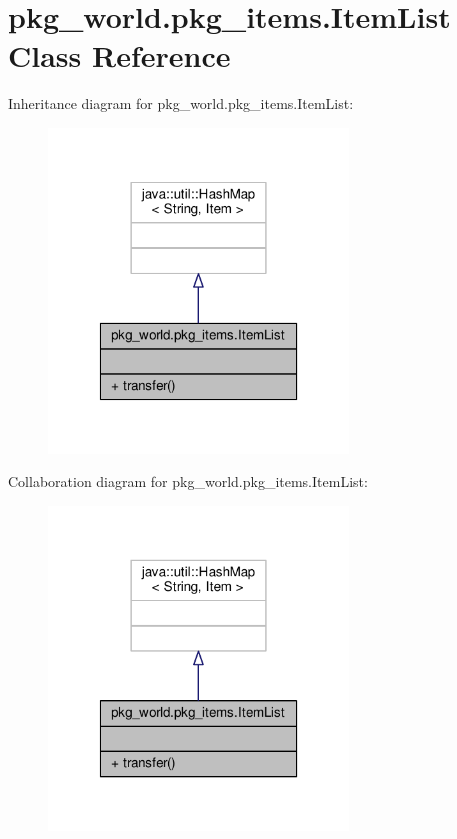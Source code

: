 \hypertarget{classpkg__world_1_1pkg__items_1_1ItemList}{\section{pkg\-\_\-world.\-pkg\-\_\-items.\-Item\-List Class Reference}
\label{classpkg__world_1_1pkg__items_1_1ItemList}
}


Inheritance diagram for pkg\-\_\-world.\-pkg\-\_\-items.\-Item\-List\-:
\nopagebreak
\begin{figure}[H]
\begin{center}
\leavevmode
\includegraphics[width=226pt]{classpkg__world_1_1pkg__items_1_1ItemList__inherit__graph}
\end{center}
\end{figure}


Collaboration diagram for pkg\-\_\-world.\-pkg\-\_\-items.\-Item\-List\-:
\nopagebreak
\begin{figure}[H]
\begin{center}
\leavevmode
\includegraphics[width=226pt]{classpkg__world_1_1pkg__items_1_1ItemList__coll__graph}
\end{center}
\end{figure}
